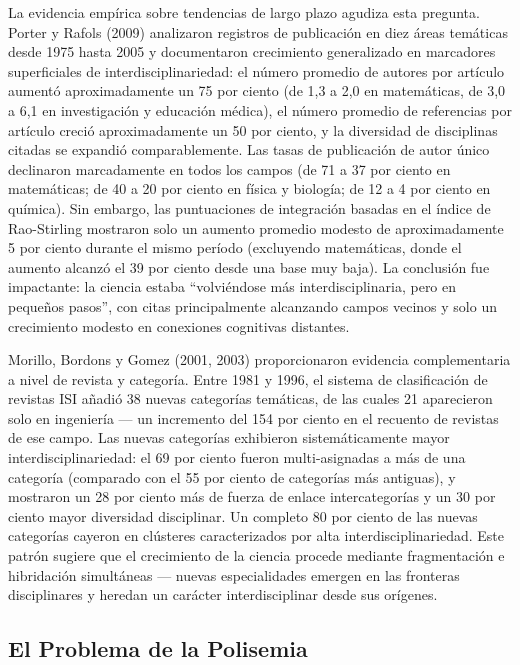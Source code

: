 \documentclass[
]{article}
\begin{document}
La evidencia empírica sobre tendencias de largo plazo agudiza esta
pregunta. Porter y Rafols (2009) analizaron registros de publicación en
diez áreas temáticas desde 1975 hasta 2005 y documentaron crecimiento
generalizado en marcadores superficiales de interdisciplinariedad: el
número promedio de autores por artículo aumentó aproximadamente un 75
por ciento (de 1,3 a 2,0 en matemáticas, de 3,0 a 6,1 en investigación y
educación médica), el número promedio de referencias por artículo creció
aproximadamente un 50 por ciento, y la diversidad de disciplinas citadas
se expandió comparablemente. Las tasas de publicación de autor único
declinaron marcadamente en todos los campos (de 71 a 37 por ciento en
matemáticas; de 40 a 20 por ciento en física y biología; de 12 a 4 por
ciento en química). Sin embargo, las puntuaciones de integración basadas
en el índice de Rao-Stirling mostraron solo un aumento promedio modesto
de aproximadamente 5 por ciento durante el mismo período (excluyendo
matemáticas, donde el aumento alcanzó el 39 por ciento desde una base
muy baja). La conclusión fue impactante: la ciencia estaba ``volviéndose
más interdisciplinaria, pero en pequeños pasos'', con citas
principalmente alcanzando campos vecinos y solo un crecimiento modesto
en conexiones cognitivas distantes.

Morillo, Bordons y Gomez (2001, 2003) proporcionaron evidencia
complementaria a nivel de revista y categoría. Entre 1981 y 1996, el
sistema de clasificación de revistas ISI añadió 38 nuevas categorías
temáticas, de las cuales 21 aparecieron solo en ingeniería --- un
incremento del 154 por ciento en el recuento de revistas de ese campo.
Las nuevas categorías exhibieron sistemáticamente mayor
interdisciplinariedad: el 69 por ciento fueron multi-asignadas a más de
una categoría (comparado con el 55 por ciento de categorías más
antiguas), y mostraron un 28 por ciento más de fuerza de enlace
intercategorías y un 30 por ciento mayor diversidad disciplinar. Un
completo 80 por ciento de las nuevas categorías cayeron en clústeres
caracterizados por alta interdisciplinariedad. Este patrón sugiere que
el crecimiento de la ciencia procede mediante fragmentación e
hibridación simultáneas --- nuevas especialidades emergen en las
fronteras disciplinares y heredan un carácter interdisciplinar desde sus
orígenes.

\hypertarget{el-problema-de-la-polisemia}{%
\subsection{El Problema de la
Polisemia}\label{el-problema-de-la-polisemia}}
\end{document}
